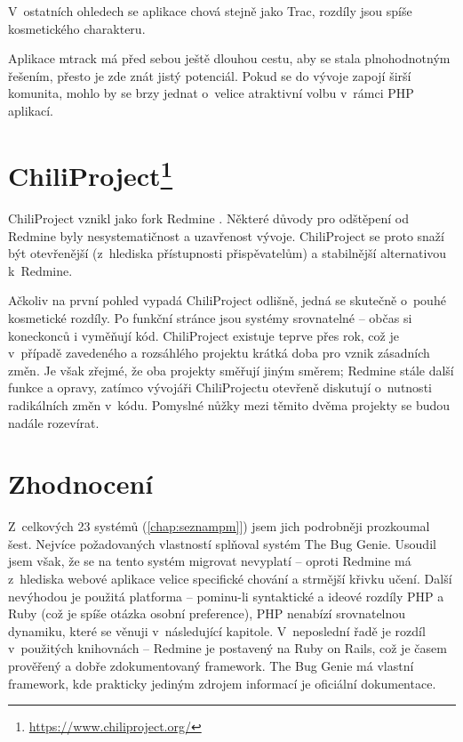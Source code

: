 \documentclass[thesis=B,czech]{FITthesis}[2012/05/02]
\begin{document}
V~ostatních ohledech se aplikace chová stejně jako Trac, rozdíly jsou
spíše kosmetického charakteru.

Aplikace mtrack má před sebou ještě dlouhou cestu, aby se stala plnohodnotným
řešením, přesto je zde znát jistý potenciál. Pokud se do vývoje zapojí
širší komunita, mohlo by se brzy jednat o~velice atraktivní volbu
v~rámci PHP aplikací.

\section[ChiliProject]{ChiliProject\footnote{\url{https://www.chiliproject.org/}}}

ChiliProject vznikl jako \gls{fork} Redmine
\citep{ChiliProjectWhyFork}. Některé důvody pro odštěpení od Redmine
byly nesystematičnost a uzavřenost vývoje. ChiliProject se proto snaží
být otevřenější (z~hlediska přístupnosti přispěvatelům) a stabilnější
alternativou k~Redmine.

Ačkoliv na první pohled vypadá ChiliProject odlišně, jedná se skutečně
o~pouhé kosmetické rozdíly. Po funkční stránce jsou systémy srovnatelné -- občas
si koneckonců i vyměňují kód. ChiliProject existuje teprve přes
rok, což je v~případě zavedeného a rozsáhlého projektu krátká doba pro
vznik zásadních změn. Je však zřejmé, že oba projekty směřují jiným
směrem; Redmine stále  další funkce a opravy, zatímco
vývojáři ChiliProjectu otevřeně diskutují o~nutnosti radikálních změn
v~kódu. Pomyslné nůžky mezi těmito dvěma projekty se budou nadále
rozevírat.

\section{Zhodnocení}

Z~celkových 23 systémů (\autoref{chap:seznampm}]) jsem jich podrobněji
prozkoumal šest. Nejvíce požadovaných vlastností splňoval systém The Bug
Genie. Usoudil jsem však, že se na tento systém migrovat nevyplatí --
oproti Redmine má z~hlediska webové aplikace velice specifické chování a
strmější křivku učení. Další nevýhodou je použitá platforma -- pominu-li
syntaktické a ideové rozdíly PHP a Ruby (což je spíše otázka osobní
preference), PHP nenabízí srovnatelnou dynamiku, které se věnuji
v~následující kapitole. V~neposlední řadě je
rozdíl v~použitých knihovnách -- Redmine je postavený na Ruby on Rails,
což je časem prověřený a dobře zdokumentovaný framework. The Bug Genie
má vlastní framework, kde prakticky jediným zdrojem informací je
oficiální dokumentace.
\end{document}
